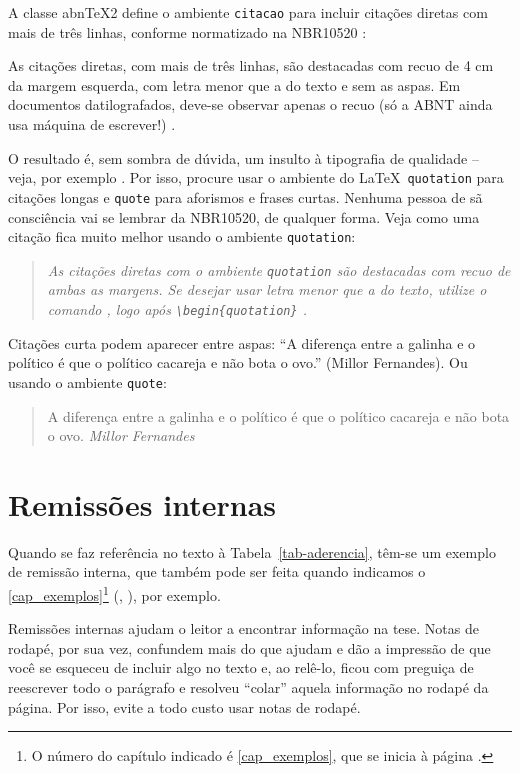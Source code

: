 A classe {abn\TeX{}2} define o ambiente \texttt{citacao} para incluir
citações diretas com mais de três linhas, conforme normatizado na NBR10520 \cite{NBR10520:2002}:
\begin{citacao}
As citações diretas, com mais de três linhas, são
destacadas com recuo de 4 cm da margem esquerda, com letra menor que a do texto
e sem as aspas. Em documentos datilografados, deve-se
observar apenas o recuo (só a ABNT ainda usa máquina de escrever!) \cite[5.3]{NBR10520:2002}. 
\end{citacao}
O resultado é, sem sombra de dúvida, um insulto à tipografia de qualidade 
-- veja, por exemplo .
Por isso, procure usar o ambiente do \LaTeX\ \texttt{quotation} para citações longas
e \texttt{quote} para aforismos e frases curtas. Nenhuma pessoa de sã
consciência vai se lembrar da NBR10520, de qualquer forma.   
Veja como uma citação fica muito melhor usando o ambiente \texttt{quotation}:
	\begin{quotation}\itshape
	As citações diretas com o ambiente \texttt{quotation} são
	destacadas com recuo de ambas as margens. 
	Se desejar usar letra menor que a do texto,
	utilize o comando \upshape{\verb|\small|}\itshape, logo após \upshape\verb|\begin{quotation}| \cite[p.~26]{LaTeX}.
	\end{quotation}

Citações curta podem aparecer entre aspas: ``A diferença entre a galinha e o político é 
que o político cacareja e não bota o ovo.'' (Millor Fernandes). Ou usando o ambiente \verb|quote|:
	\begin{quote}
	A diferença entre a galinha e o político é que 
	o político cacareja e não bota o ovo.
	\emph{Millor Fernandes}
	\end{quote} 

\section{Remissões internas}

Quando se faz referência no texto à Tabela~\ref{tab-aderencia}, têm-se um exemplo de remissão interna,
que também pode ser feita quando indicamos o \autoref{cap_exemplos}\footnote{O
número do capítulo indicado é
\ref{cap_exemplos}, que se inicia à página \pageref{cap_exemplos}.}
(, ), por exemplo.

Remissões internas ajudam o leitor a encontrar informação na tese. Notas de 
rodapé, por sua vez, confundem mais do que ajudam e dão a impressão de que você
se esqueceu de incluir algo no texto e, ao relê-lo, ficou com 
preguiça de reescrever todo o parágrafo e resolveu ``colar'' aquela informação
no rodapé da página. Por isso, evite a todo custo usar notas de rodapé.

